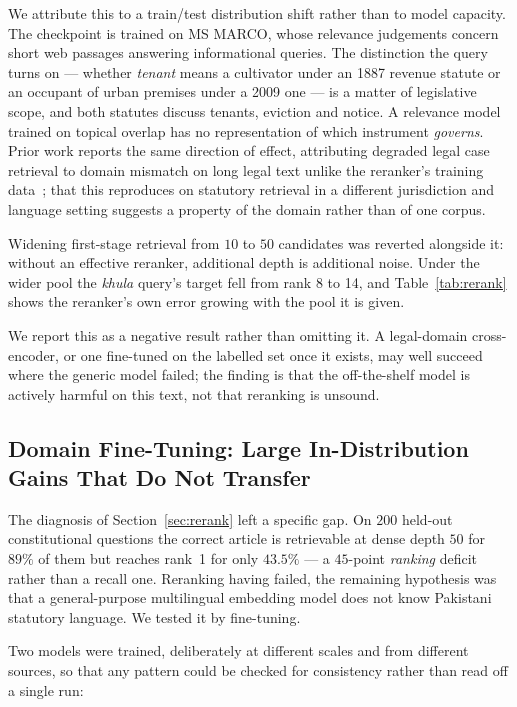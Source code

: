 \documentclass[conference]{IEEEtran}
\begin{document}
We attribute this to a train/test distribution shift rather than to model
capacity. The checkpoint is trained on MS MARCO, whose relevance judgements
concern short web passages answering informational queries. The distinction the
query turns on --- whether \emph{tenant} means a cultivator under an 1887
revenue statute or an occupant of urban premises under a 2009 one --- is a
matter of legislative scope, and both statutes discuss tenants, eviction and
notice. A relevance model trained on topical overlap has no representation of
which instrument \emph{governs}. Prior work reports the same direction of
effect, attributing degraded legal case retrieval to domain mismatch on long
legal text unlike the reranker's training data~\cite{hou2024clerc}; that this
reproduces on statutory retrieval in a different jurisdiction and language
setting suggests a property of the domain rather than of one corpus.

Widening first-stage retrieval from $10$ to $50$ candidates was reverted
alongside it: without an effective reranker, additional depth is additional
noise. Under the wider pool the \emph{khula} query's target fell from rank 8 to
14, and Table~\ref{tab:rerank} shows the reranker's own error growing with the
pool it is given.

We report this as a negative result rather than omitting it. A legal-domain
cross-encoder, or one fine-tuned on the labelled set once it exists, may well
succeed where the generic model failed; the finding is that the off-the-shelf
model is actively harmful on this text, not that reranking is unsound.

\subsection{Domain Fine-Tuning: Large In-Distribution Gains That Do Not Transfer}
\label{sec:finetune}
The diagnosis of Section~\ref{sec:rerank} left a specific gap. On $200$ held-out
constitutional questions the correct article is retrievable at dense depth $50$
for $89\%$ of them but reaches rank~1 for only $43.5\%$ --- a $45$-point
\emph{ranking} deficit rather than a recall one. Reranking having failed, the
remaining hypothesis was that a general-purpose multilingual embedding model
does not know Pakistani statutory language. We tested it by fine-tuning.

Two models were trained, deliberately at different scales and from different
sources, so that any pattern could be checked for consistency rather than read
off a single run:
\end{document}
